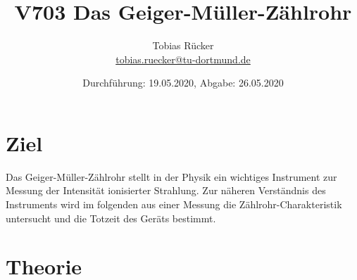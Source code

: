 


    \title{V703 Das Geiger-Müller-Zählrohr}
    \author{  
    Tobias Rücker\\
    \texorpdfstring{\href{mailto:tobias.ruecker@tu-dortmund.de}{tobias.ruecker@tu-dortmund.de}
    }{}}
    \date{Durchführung: 19.05.2020, Abgabe: 26.05.2020 \vspace{-4ex}}
\maketitle
\thispagestyle{empty}

\newpage
\tableofcontents
\thispagestyle{empty}
\newpage


\setcounter{page}{1}
\section{Ziel}\justifying

Das Geiger-Müller-Zählrohr stellt in der Physik ein wichtiges Instrument zur Messung der Intensität
ionisierter Strahlung. Zur näheren Verständnis des Instruments wird im folgenden aus einer 
Messung die Zählrohr-Charakteristik untersucht und die Totzeit des Geräts bestimmt. 


\section{Theorie}\justifying

